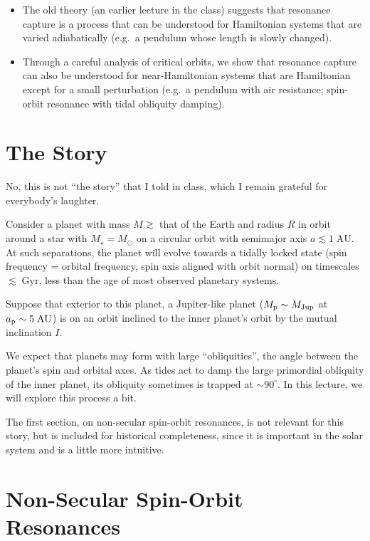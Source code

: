 \documentclass[11pt,
        usenames, %
        dvipsnames %
    ]{article}
\begin{document}
\begin{itemize}
\begin{itemize}
            \item The old theory (an earlier lecture in the class) suggests that
                resonance capture is a process that can be understood for
                Hamiltonian systems that are varied adiabatically (e.g.\ a
                pendulum whose length is slowly changed).

            \item Through a careful analysis of critical orbits, we show that
                resonance capture can also be understood for near-Hamiltonian
                systems that are Hamiltonian except for a small perturbation
                (e.g.\ a pendulum with air resistance; spin-orbit resonance with
                tidal obliquity damping).
        \end{itemize}
\end{itemize}

\section{The Story}

No, this is not ``the story'' that I told in class, which I remain grateful for
everybody's laughter.

Consider a planet with mass $M \gtrsim$ that of the Earth and radius $R$ in
orbit around a star with $M_\star = M_\odot$ on a circular orbit with semimajor
axis $a \lesssim 1\;\mathrm{AU}$. At such separations, the planet will evolve
towards a tidally locked state (spin frequency = orbital frequency, spin axis
aligned with orbit normal) on timescales $\lesssim \;\mathrm{Gyr}$, less than
the age of most observed planetary systems.

Suppose that exterior to this planet, a Jupiter-like planet ($M_{\rm p} \sim
M_{\rm Jup}$ at $a_{\rm p} \sim 5\;\mathrm{AU}$) is on an orbit inclined to the
inner planet's orbit by the mutual inclination $I$.

We expect that planets may form with large ``obliquities'', the angle between
the planet's spin and orbital axes. As tides act to damp the large primordial
obliquity of the inner planet, its obliquity sometimes is trapped at $\sim
90^\circ$. In this lecture, we will explore this process a bit.

The first section, on non-secular spin-orbit resonances, is not relevant for
this story, but is included for historical completeness, since it is important
in the solar system and is a little more intuitive.

\section{Non-Secular Spin-Orbit Resonances}
\end{document}
